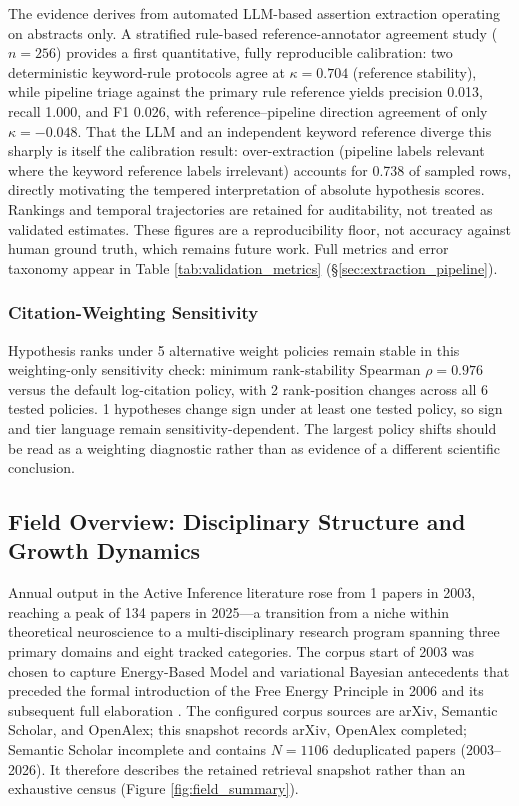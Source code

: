 \documentclass[
  english,
]{article}
\begin{document}
The evidence derives from automated LLM-based assertion extraction
operating on abstracts only. A stratified rule-based reference-annotator
agreement study (\(n = 256\)) provides a first quantitative, fully
reproducible calibration: two deterministic keyword-rule protocols agree
at \(\kappa = 0.704\) (reference stability), while pipeline triage
against the primary rule reference yields precision 0.013, recall 1.000,
and F1 0.026, with reference--pipeline direction agreement of only
\(\kappa = -0.048\). That the LLM and an independent keyword reference
diverge this sharply is itself the calibration result: over-extraction
(pipeline labels relevant where the keyword reference labels irrelevant)
accounts for 0.738 of sampled rows, directly motivating the tempered
interpretation of absolute hypothesis scores. Rankings and temporal
trajectories are retained for auditability, not treated as validated
estimates. These figures are a reproducibility floor, not accuracy
against human ground truth, which remains future work. Full metrics and
error taxonomy appear in Table \ref{tab:validation_metrics}
(\S\ref{sec:extraction_pipeline}).

\subsubsection{Citation-Weighting
Sensitivity}\label{citation-weighting-sensitivity}

Hypothesis ranks under 5 alternative weight policies remain stable in
this weighting-only sensitivity check: minimum rank-stability Spearman
\(\rho = 0.976\) versus the default log-citation policy, with 2
rank-position changes across all 6 tested policies. 1 hypotheses change
sign under at least one tested policy, so sign and tier language remain
sensitivity-dependent. The largest policy shifts should be read as a
weighting diagnostic rather than as evidence of a different scientific
conclusion.

\newpage

\subsection{Field Overview: Disciplinary Structure and Growth
Dynamics}\label{sec:field_overview}

Annual output in the Active Inference literature rose from 1 papers in
2003, reaching a peak of 134 papers in 2025---a transition from a niche
within theoretical neuroscience to a multi-disciplinary research program
spanning three primary domains and eight tracked categories. The corpus
start of 2003 was chosen to capture Energy-Based Model and variational
Bayesian antecedents \citep{dayan1995helmholtz, lecun2006tutorial} that
preceded the formal introduction of the Free Energy Principle in 2006
\citep{friston2006free} and its subsequent full elaboration
\citep{friston2010free}. The configured corpus sources are arXiv,
Semantic Scholar, and OpenAlex; this snapshot records arXiv, OpenAlex
completed; Semantic Scholar incomplete and contains \(N = 1106\)
deduplicated papers (2003--2026). It therefore describes the retained
retrieval snapshot rather than an exhaustive census (Figure
\ref{fig:field_summary}).
\end{document}
